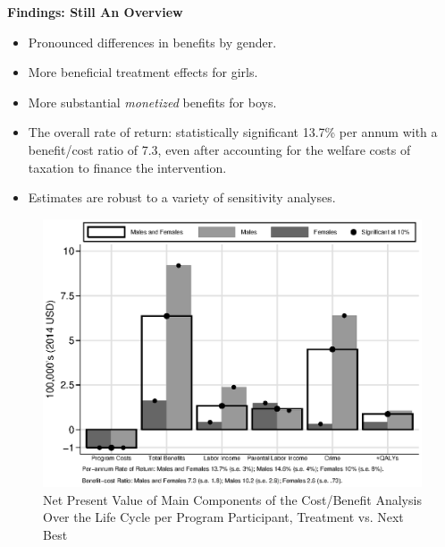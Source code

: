 \documentclass[static]{JJH-Beamer}
\begin{document}
\begin{frame}

\begin{center}
\textbf{Findings: Still An Overview}
\end{center}

\begin{itemize}
\item Pronounced differences in benefits by gender.
\item More beneficial treatment effects for girls.
\item More substantial \emph{monetized} benefits for boys.
\item The overall rate of return: statistically significant 13.7\% per annum with a benefit/cost ratio of 7.3, even after accounting for the welfare costs of taxation to finance the intervention.
\item Estimates are robust to a variety of sensitivity analyses.
\end{itemize}

\end{frame}

\begin{frame}

\begin{figure}[H]
\caption{Net Present Value of Main Components of the Cost/Benefit Analysis Over the Life Cycle per Program Participant, Treatment vs. Next Best}\label{figure:main}
\begin{center}
\includegraphics[width=.75\columnwidth]{output/abccare_npvssumm.eps}
\end{center}
\end{figure}
\end{frame}
\end{document}
